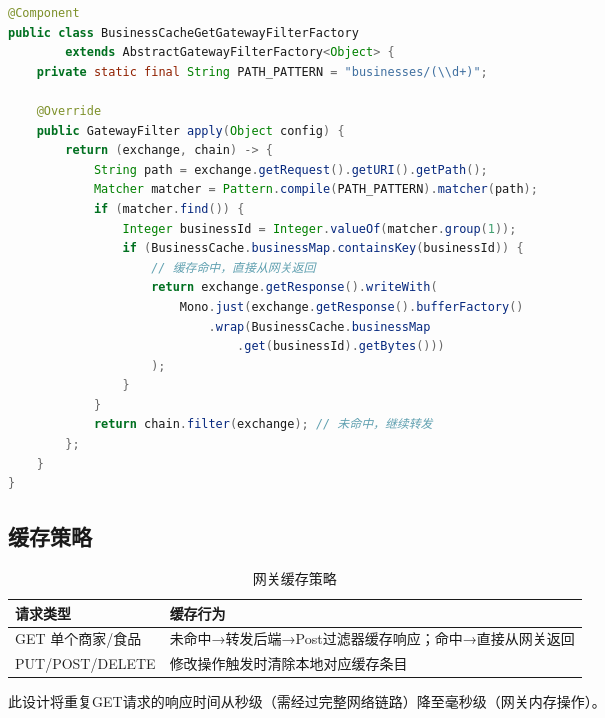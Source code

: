 \begin{lstlisting}[language=Java, caption=BusinessCacheGet过滤器]
@Component
public class BusinessCacheGetGatewayFilterFactory
        extends AbstractGatewayFilterFactory<Object> {
    private static final String PATH_PATTERN = "businesses/(\\d+)";

    @Override
    public GatewayFilter apply(Object config) {
        return (exchange, chain) -> {
            String path = exchange.getRequest().getURI().getPath();
            Matcher matcher = Pattern.compile(PATH_PATTERN).matcher(path);
            if (matcher.find()) {
                Integer businessId = Integer.valueOf(matcher.group(1));
                if (BusinessCache.businessMap.containsKey(businessId)) {
                    // 缓存命中，直接从网关返回
                    return exchange.getResponse().writeWith(
                        Mono.just(exchange.getResponse().bufferFactory()
                            .wrap(BusinessCache.businessMap
                                .get(businessId).getBytes()))
                    );
                }
            }
            return chain.filter(exchange); // 未命中，继续转发
        };
    }
}
\end{lstlisting}

\subsection{缓存策略}

\begin{table}[H]
	\centering
	\caption{网关缓存策略}
	\begin{tabular}{p{5.0cm}p{10.0cm}}
		\hline
		\textbf{请求类型} & \textbf{缓存行为} \\
		\hline
		GET 单个商家/食品 & 未命中→转发后端→Post过滤器缓存响应；命中→直接从网关返回 \\
		PUT/POST/DELETE & 修改操作触发时清除本地对应缓存条目 \\
		\hline
	\end{tabular}
\end{table}

此设计将重复GET请求的响应时间从秒级（需经过完整网络链路）降至毫秒级（网关内存操作）。

